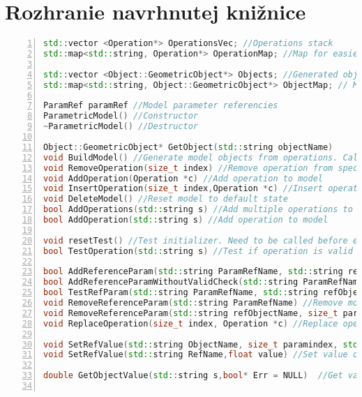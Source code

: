 \chapter{Rozhranie navrhnutej knižnice}
\begin{lstlisting}[numbers=left,language=c++]
std::vector <Operation*> OperationsVec; //Operations stack 
std::map<std::string, Operation*> OperationMap; //Map for easier acces to operations

std::vector <Object::GeometricObject*> Objects; //Generated objects of parametric model
std::map<std::string, Object::GeometricObject*> ObjectMap; // Map for objects of parametric model

ParamRef paramRef //Model parameter referencies
ParametricModel() //Constructor
~ParametricModel() //Destructor

Object::GeometricObject* GetObject(std::string objectName)
void BuildModel() //Generate model objects from operations. Call this to apply modifications
void RemoveOperation(size_t index) //Remove operation from specific index
void AddOperation(Operation *c) //Add operation to model
void InsertOperation(size_t index,Operation *c) //Insert operation to specific position
void DeleteModel() //Reset model to default state
bool AddOperations(std::string s) //Add multiple operations to model
bool AddOperation(std::string s) //Add operation to model

void resetTest() //Test initializer. Need to be called before every test 
bool TestOperation(std::string s) //Test if operation is valid

bool AddReferenceParam(std::string ParamRefName, std::string refObjectName, size_t paramIndex) //Add model parameter
bool AddReferenceParamWithoutValidCheck(std::string ParamRefName, std::string refObjectName, size_t paramIndex) 
bool TestRefParam(std::string ParamRefName, std::string refObjectName, size_t paramIndex) //Test if parameter can be added to object
void RemoveReferenceParam(std::string ParamRefName) //Remove model parameter
void RemoveReferenceParam(std::string refObjectName, size_t paramIndex) //Remove model parameter from specific object  
void ReplaceOperation(size_t index, Operation *c) //Replace operation

void SetRefValue(std::string ObjectName, size_t paramindex, std::string value) //Set value of operation parameter 
void SetRefValue(std::string RefName,float value) //Set value of parameter

double GetObjectValue(std::string s,bool* Err = NULL)  //Get value in string form


\end{lstlisting}
